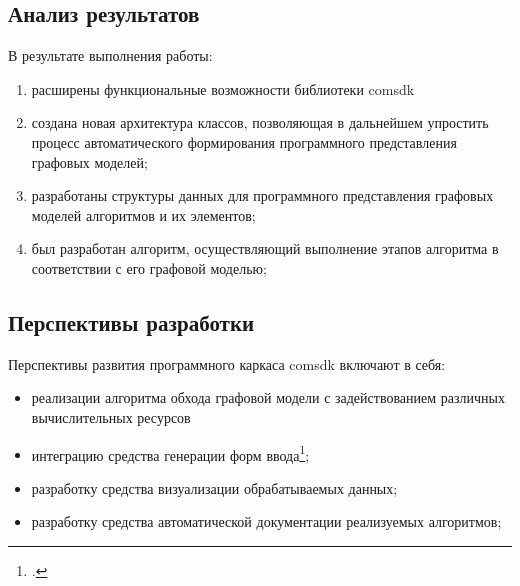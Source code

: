 ﻿%
\subsection*{Анализ результатов}
\begin{frame}%

	В результате выполнения работы:
	\begin{enumerate}[1)]
		\item расширены функциональные возможности библиотеки comsdk
		\item создана новая архитектура классов, позволяющая в дальнейшем упростить процесс автоматического формирования программного представления графовых моделей;
		\item разработаны структуры данных для программного представления графовых моделей алгоритмов и их элементов;
		\item был разработан алгоритм, осуществляющий выполнение этапов алгоритма в соответствии с его графовой моделью;
	\end{enumerate}

\end{frame}
\subsection*{Перспективы разработки}
\begin{frame}
	Перспективы развития программного каркаса comsdk включают в себя:
	\begin{itemize}
		\item реализации алгоритма обхода графовой модели с задействованием различных вычислительных ресурсов
		\item интеграцию средства генерации форм ввода\footcite{SokolovPershin2017};
		\item разработку средства визуализации обрабатываемых данных;
		\item разработку средства автоматической документации реализуемых алгоритмов;
	\end{itemize}

\end{frame}

